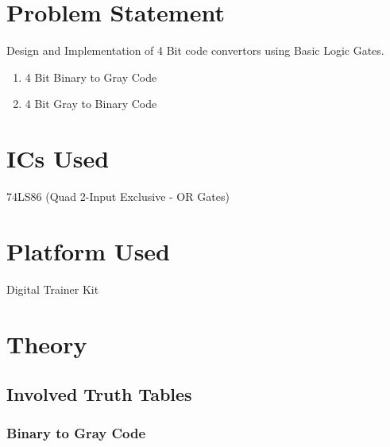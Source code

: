 \documentclass[11pt]{article}
\begin{document}
\tableofcontents
\thispagestyle{empty}
\clearpage


\setcounter{page}{1}

\section{Problem Statement}
Design and Implementation of 4 Bit code convertors using Basic Logic Gates.

\begin{enumerate}
	\item 4 Bit Binary to Gray Code
	\item 4 Bit Gray to Binary Code
\end{enumerate}

\section{ICs Used}
74LS86 (Quad 2-Input Exclusive - OR Gates)

\section{Platform Used}
Digital Trainer Kit

\section{Theory}

\subsection{Involved Truth Tables}

\subsubsection{Binary to Gray Code}
\end{document}
